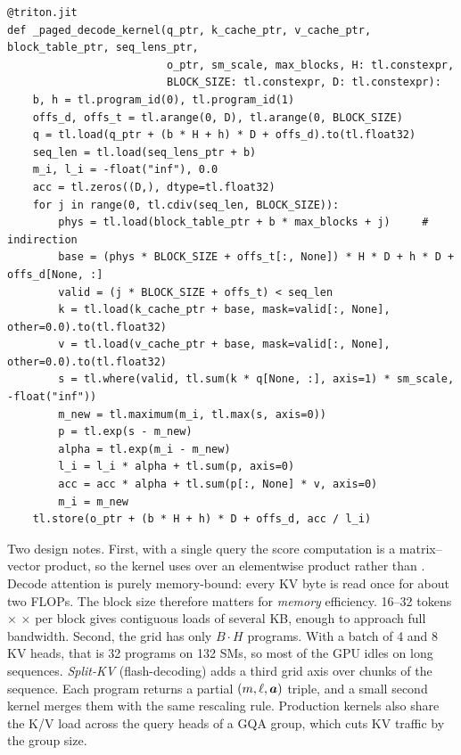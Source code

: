 \begin{lstlisting}[caption={Decode attention over a paged KV cache (one query token per
sequence).},label={lst:triton:paged}]
@triton.jit
def _paged_decode_kernel(q_ptr, k_cache_ptr, v_cache_ptr, block_table_ptr, seq_lens_ptr,
                         o_ptr, sm_scale, max_blocks, H: tl.constexpr,
                         BLOCK_SIZE: tl.constexpr, D: tl.constexpr):
    b, h = tl.program_id(0), tl.program_id(1)
    offs_d, offs_t = tl.arange(0, D), tl.arange(0, BLOCK_SIZE)
    q = tl.load(q_ptr + (b * H + h) * D + offs_d).to(tl.float32)
    seq_len = tl.load(seq_lens_ptr + b)
    m_i, l_i = -float("inf"), 0.0
    acc = tl.zeros((D,), dtype=tl.float32)
    for j in range(0, tl.cdiv(seq_len, BLOCK_SIZE)):
        phys = tl.load(block_table_ptr + b * max_blocks + j)     # indirection
        base = (phys * BLOCK_SIZE + offs_t[:, None]) * H * D + h * D + offs_d[None, :]
        valid = (j * BLOCK_SIZE + offs_t) < seq_len
        k = tl.load(k_cache_ptr + base, mask=valid[:, None], other=0.0).to(tl.float32)
        v = tl.load(v_cache_ptr + base, mask=valid[:, None], other=0.0).to(tl.float32)
        s = tl.where(valid, tl.sum(k * q[None, :], axis=1) * sm_scale, -float("inf"))
        m_new = tl.maximum(m_i, tl.max(s, axis=0))
        p = tl.exp(s - m_new)
        alpha = tl.exp(m_i - m_new)
        l_i = l_i * alpha + tl.sum(p, axis=0)
        acc = acc * alpha + tl.sum(p[:, None] * v, axis=0)
        m_i = m_new
    tl.store(o_ptr + (b * H + h) * D + offs_d, acc / l_i)
\end{lstlisting}

Two design notes. First, with a single query the score computation is a matrix--vector
product, so the kernel uses  over an elementwise product rather than
. Decode attention is purely memory-bound: every KV byte is read once for
about two FLOPs. The block size therefore matters for \emph{memory} efficiency.
16--32 tokens $\times$  $\times$  per block gives contiguous loads
of several KB, enough to approach full bandwidth. Second, the grid has only $B\cdot H$
programs. With a batch of 4 and 8 KV heads, that is 32 programs on 132 SMs, so most of
the GPU idles on long sequences. \emph{Split-KV} (flash-decoding) adds a third grid
axis over chunks of the sequence. Each program returns a partial $(m,\ell,\bm{a})$
triple, and a small second kernel merges them with the same rescaling rule. Production
kernels also share the K/V load across the query heads of a GQA group, which cuts KV
traffic by the group size.

